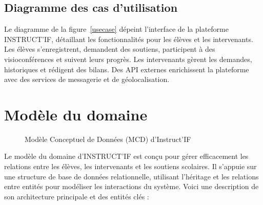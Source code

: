 \subsection{Diagramme des cas d'utilisation}
Le diagramme de la figure~\ref{usecase} dépeint l'interface de la plateforme INSTRUCT'IF, détaillant les fonctionnalités pour les élèves et les intervenants. Les élèves s'enregistrent, demandent des soutiens, participent à des visioconférences et suivent leurs progrès. Les intervenants gèrent les demandes, historiques et rédigent des bilans. Des API externes enrichissent la plateforme avec des services de messagerie et de géolocalisation.

\section{Modèle du domaine}

\begin{figure}[H]
    \centering
    \caption{Modèle Conceptuel de Données (MCD) d'Instruct'IF}
    \label{modele}
\end{figure}

Le modèle du domaine d'INSTRUCT'IF est conçu pour gérer efficacement les relations entre les élèves, les intervenants et les soutiens scolaires. Il s'appuie sur une structure de base de données relationnelle, utilisant l'héritage et les relations entre entités pour modéliser les interactions du système. Voici une description de son architecture principale et des entités clés :

